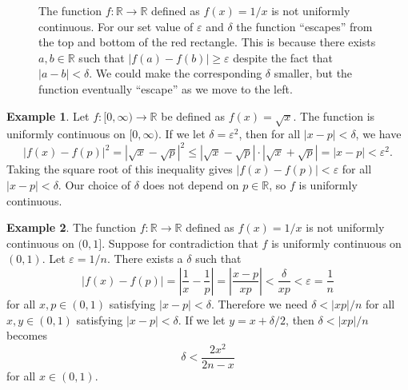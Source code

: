 \documentclass{article}
\newcommand{\R}{\mathbb{R}}
\theoremstyle{definition}
\newtheorem{example}{Example}[section]
\begin{document}
\begin{figure}[h!]
	\centering
	\caption{The function $ f:\R\to\R $ defined as $ f(x)=1/x $ is not uniformly continuous. For our set value of $ \varepsilon $ and $ \delta $ the function ``escapes'' from the top and bottom of the red rectangle. This is because there exists $ a,b\in\R $ such that $ |f(a)-f(b)|\ge\varepsilon $ despite the fact that $ |a-b|<\delta $. We could make the corresponding $ \delta $ smaller, but the function eventually ``escape'' as we move to the left. }
\end{figure}
\begin{example}
Let $ f:[0,\infty)\to\R $ be defined as $ f(x)=\sqrt{x} $. The function is uniformly continuous on $ [0,\infty) $. If we let $ \delta=\varepsilon^2 $, then for all $ |x-p|<\delta $, we have $$|f(x)-f(p)|^2=|\sqrt{x}-\sqrt{p}|^2\le|\sqrt{x}-\sqrt{p}|\cdot|\sqrt{x}+\sqrt{p}|=|x-p|<\varepsilon^2 .$$ Taking the square root of this inequality gives $ |f(x)-f(p)|<\varepsilon $ for all $ |x-p|<\delta $. Our choice of $ \delta $ does not depend on $ p\in\R $, so $ f $ is uniformly continuous. 
\end{example}
\begin{example}
	The function $ f:\R\to\R $ defined as $ f(x)=1/x $ is not uniformly continuous on $ (0,1] $. Suppose for contradiction that $ f $ is uniformly continuous on $ (0,1) $. Let $ \varepsilon=1/n $. There exists a $ \delta $ such that $$ |f(x)-f(p)|=\left\lvert\frac{1}{x}-\frac{1}{p}\right\rvert=\left\lvert\frac{x-p}{xp}\right\rvert<\frac{\delta}{xp}<\varepsilon=\frac{1}{n} $$ for all $ x,p\in(0,1) $ satisfying $ |x-p|<\delta $. Therefore we need $ \delta<|xp|/n $ for all $ x,y\in(0,1) $ satisfying $ |x-p|<\delta $. If we let $ y=x+\delta/2 $, then $ \delta<|xp|/n $ becomes $$\delta <\frac{2x^2}{2n-x} $$ for all $ x\in(0,1) $. 
\end{example}
\end{document}
